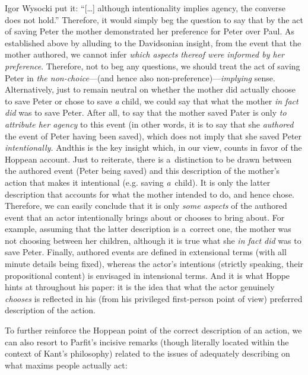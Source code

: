 \begin{artengenv}{Igor Wysocki}
 put it: ``[…] although intentionality implies agency, the converse does not hold.'' Therefore, it would simply beg the question to say that by the act of saving Peter the mother demonstrated her preference for Peter over Paul. As established above by alluding to the Davidsonian insight, from the event that the mother authored, we cannot infer \textit{which aspects thereof were informed by her preference}. Therefore, not to beg any questions, we should treat the act of saving Peter in \textit{the non-choice}---(and hence also non-preference)---\textit{implying} sense. Alternatively, just to remain neutral on whether the mother did actually choose to save Peter or chose to save \textit{a} child, we could say that what the mother \textit{in fact did} was to save Peter. After all, to say that the mother saved Pater is only \textit{to attribute her agency} to this event (in other words, it is to say that she \textit{authored} the event of Peter having been saved), which does not imply that she saved Peter \textit{intentionally.} Andthis is the key insight which, in our view, counts in favor of the Hoppean account. Just to reiterate, there is a~distinction to be drawn between the authored event (Peter being saved) and this description of the mother's action that makes it intentional (e.g. saving \textit{a}~child). It is only the latter description that accounts for what the mother intended to do, and hence chose. Therefore, we can easily conclude that it is only \textit{some aspects} of the authored event that an actor intentionally brings about or chooses to bring about. For example, assuming that the latter description is a~correct one, the mother was not choosing between her children, although it is true what she \textit{in fact did} was to save Peter. Finally, authored events are defined in extensional terms (with all minute details being fixed), whereas the actor's intentions (strictly speaking, their propositional content) is envisaged in intensional terms. And it is what Hoppe 
\parencite*[][]{hoppe_must_2005} %
 hints at throughout his paper: it is the idea that what the actor genuinely \textit{chooses} is reflected in his (from his privileged first-person point of view) preferred description of the action.

To further reinforce the Hoppean point of the correct description of an action, we can also resort to Parfit's
\parencite*[][p.289]{parfit_what_2011} %
 incisive remarks (though literally located within the context of Kant's philosophy) related to the issues of adequately describing on what maxims people actually act:


\end{artengenv}
